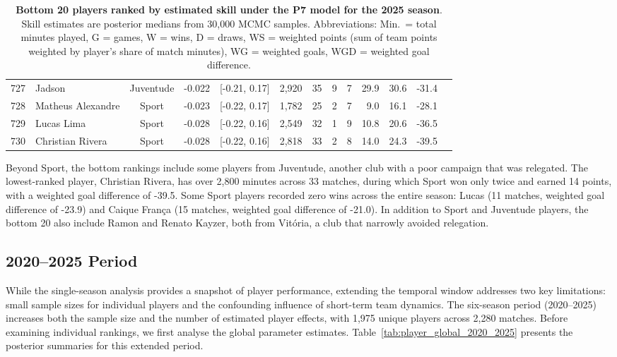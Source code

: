 \begin{table}[htbp]
\begin{tabular}{rlcccrrrrrrrr}
        727 & Jadson & Juventude & -0.022 & [-0.21, 0.17] & 2,920 & 35 & 9 & 7 & 29.9 & 30.6 & -31.4 \\
        728 & Matheus Alexandre & Sport & -0.023 & [-0.22, 0.17] & 1,782 & 25 & 2 & 7 & 9.0 & 16.1 & -28.1 \\
        729 & Lucas Lima & Sport & -0.028 & [-0.22, 0.16] & 2,549 & 32 & 1 & 9 & 10.8 & 20.6 & -36.5 \\
        730 & Christian Rivera & Sport & -0.028 & [-0.22, 0.16] & 2,818 & 33 & 2 & 8 & 14.0 & 24.3 & -39.5 \\
        \bottomrule
    \end{tabular}
    \caption{
        \textbf{Bottom 20 players ranked by estimated skill under the P7 model for the 2025 season}.
        Skill estimates are posterior medians from 30,000 MCMC samples.
        Abbreviations: Min.\ = total minutes played, G = games, W = wins, D = draws, WS = weighted points (sum of team points weighted by player's share of match minutes), WG = weighted goals, WGD = weighted goal difference.
    }
    \label{tab:bottom20_2025}
\end{table}

Beyond Sport, the bottom rankings include some players from Juventude, another club with a poor campaign that was relegated.
The lowest-ranked player, Christian Rivera, has over 2,800 minutes across 33 matches, during which Sport won only twice and earned 14 points, with a weighted goal difference of -39.5.
Some Sport players recorded zero wins across the entire season: Lucas (11 matches, weighted goal difference of -23.9) and Caique França (15 matches, weighted goal difference of -21.0).
In addition to Sport and Juventude players, the bottom 20 also include Ramon and Renato Kayzer, both from Vitória, a club that narrowly avoided relegation.

\subsection{2020--2025 Period}
\label{subsec:player_2020_2025}

While the single-season analysis provides a snapshot of player performance, extending the temporal window addresses two key limitations: small sample sizes for individual players and the confounding influence of short-term team dynamics.
The six-season period (2020--2025) increases both the sample size and the number of estimated player effects, with 1,975 unique players across 2,280 matches.
Before examining individual rankings, we first analyse the global parameter estimates.
Table~\ref{tab:player_global_2020_2025} presents the posterior summaries for this extended period.

